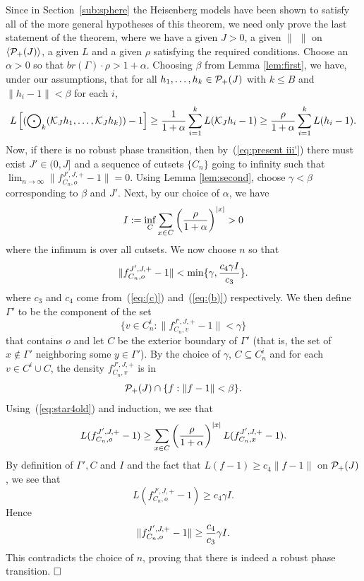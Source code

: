 Since in Section~\ref{sub:sphere}
the Heisenberg models have been shown to satisfy all of
the more general hypotheses of this theorem, we need only prove the last
statement of the theorem, where we have
a given $J >0$, a given $\|\,\,\|$ on $\langle{\cal P}_+(J)\rangle$, a given $L$ and 
a given $\rho$ satisfying the required conditions.
Choose an $\alpha > 0$ so that 
$\textstyle {br}  (\Gamma) \cdot \rho > 1 + \alpha$.
Choosing $\beta$ from Lemma \ref{lem:first}, we have, under
our assumptions, that for all $h_1 , \ldots , h_k \in {\cal P}_+(J)$ with
$k\le B$ and $\|h_i-1\| < \beta$ for each $i$, 
\begin{equation} \label{eq:star4old}
L \left [ ({\bigodot}_k ({\cal K}_J h_1 , \ldots , {\cal K}_J h_k)) - 1 \right ] 
   \geq {1 \over 1 + \alpha} \sum_{i=1}^k L ({\cal K}_J h_i - 1) 
   \geq {\rho \over 1 + \alpha} \sum_{i=1}^k L (h_i - 1). 
\end{equation}
Now, if there is no robust phase transition, then by~(\ref{eq:present iii'})
there must exist $J'\in (0,J]$ 
and a sequence of cutsets $\{ C_n \}$ going to infinity
such that $\lim_{n \rightarrow \infty} \|f^{J',J , +}_{C_n , o} - 1\| = 0$.
Using Lemma \ref{lem:second}, choose $\gamma<\beta$
corresponding to $\beta$ and $J'$. Next, by our choice of $\alpha$, we have
$$I := \inf_C \sum_{x \in C} \left ( {\rho \over 1 + \alpha} \right)^{|x|} 
   > 0$$
where the infimum is over all cutsets.
We now choose $n$ so that 
$$
\|f^{J',J , +}_{C_n , o} - 1\| < \min \{ \gamma , {c_4 \gamma I \over c_3} \}.
$$
where $c_3$ and $c_4$ come from~(\ref{eq:(c)}) and~(\ref{eq:(b)}) respectively.
We then define $\Gamma'$ to be the component of the set
$$\{ v \in C_n^i : \|f^{J',J , +}_{C_n , v} - 1\| < \gamma \}$$
that contains $o$
and let $C$ be the exterior boundary of $\Gamma'$
(that is, the set of $x \notin \Gamma'$ neighboring some $y \in \Gamma'$).  
By the choice of $\gamma$, $C \subseteq C_n^i$ and 
for each $v\in C^i\cup C$, the density $f^{J',J , +}_{C_n , v}$ is in
$$ {\cal P}_+(J) \cap \{f: \|f-1\| < \beta\}.  $$
Using~(\ref{eq:star4old}) and induction, we see that
$$L (f^{J',J , +}_{C_n , o} - 1) \geq \sum_{x \in C} \left ( 
   {\rho \over 1 + \alpha} \right )^{|x|} L (f^{J',J , +}_{C_n , x} - 1) .$$
By definition of $\Gamma' , C$ and $I$ and the fact that $L (f-1) \geq c_4 
\|f - 1\|$ on ${\cal P}_+(J)$, we see that 
$$L (f^{J',J , +}_{C_n , o} - 1) \geq c_4 \gamma I .$$
Hence
$$\|f^{J',J , +}_{C_n , o} - 1\| \geq {c_4 \over c_3} \gamma I .$$
This contradicts the choice of $n$, proving that there is indeed
a robust phase transition.
$\qed$

